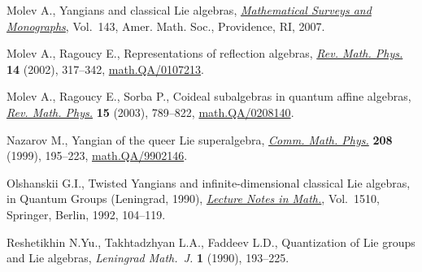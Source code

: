 \documentclass[pdftex]{sigma}
\numberwithin{theorem}{section}
\numberwithin{proposition}{section}
\numberwithin{lemma}{section}
\numberwithin{corollary}{section}
\numberwithin{definition}{section}
\numberwithin{example}{section}
\numberwithin{remark}{section}
\numberwithin{note}{section}
\numberwithin{equation}{section}
\begin{document}
\begin{thebibliography}{99}
Molev A., Yangians and classical {L}ie algebras, \href{http://dx.doi.org/10.1090/surv/143}{\textit{Mathematical Surveys
  and Monographs}}, Vol.~143, Amer. Math. Soc., Providence, RI, 2007.

Molev A., Ragoucy E., Representations of ref\/lection algebras, \href{http://dx.doi.org/10.1142/S0129055X02001156}{\textit{Rev.
  Math. Phys.}} \textbf{14} (2002), 317--342, \href{http://arxiv.org/abs/math.QA/0107213}{math.QA/0107213}.

Molev A., Ragoucy E., Sorba P., Coideal subalgebras in quantum af\/f\/ine algebras,
  \href{http://dx.doi.org/10.1142/S0129055X03001813}{\textit{Rev. Math. Phys.}} \textbf{15} (2003), 789--822,
  \href{http://arxiv.org/abs/math.QA/0208140}{math.QA/0208140}.

Nazarov M., Yangian of the queer {L}ie superalgebra, \href{http://dx.doi.org/10.1007/s002200050754}{\textit{Comm. Math. Phys.}}
  \textbf{208} (1999), 195--223, \href{http://arxiv.org/abs/math.QA/9902146}{math.QA/9902146}.

Olshanskii G.I., Twisted {Y}angians and inf\/inite-dimensional classical {L}ie
  algebras, in Quantum Groups ({L}eningrad, 1990), \href{http://dx.doi.org/10.1007/BFb0101183}{\textit{Lecture Notes in
  Math.}}, Vol.~1510, Springer, Berlin, 1992, 104--119.

Reshetikhin N.Yu., Takhtadzhyan L.A., Faddeev L.D., Quantization of {L}ie groups
  and {L}ie algebras, \textit{Leningrad Math.~J.} \textbf{1} (1990), 193--225.

\end{thebibliography}\LastPageEnding
\end{document}
